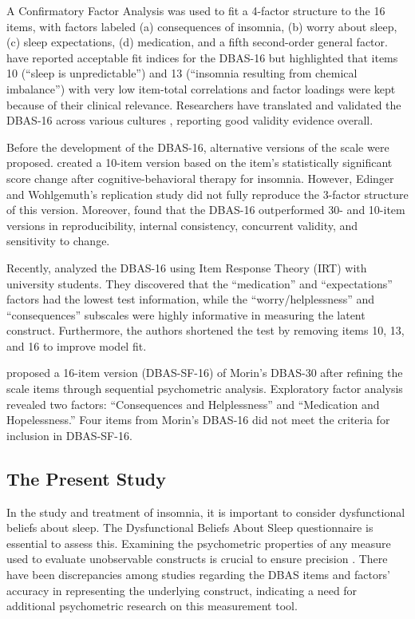 \documentclass[
  12pt,
  twoside,
  openright,
  a4paper,
  chapter=TITLE,
  section=TITLE,
  brazil]{abntex2}
\begin{document}
A Confirmatory Factor Analysis was used to fit a 4-factor structure to
the 16 items, with factors labeled (a) consequences of insomnia, (b)
worry about sleep, (c) sleep expectations, (d) medication, and a fifth
second-order general factor. \textcite{morin2007a} have reported
acceptable fit indices for the DBAS-16 but highlighted that items 10
(``sleep is unpredictable'') and 13 (``insomnia resulting from chemical
imbalance'') with very low item-total correlations and factor loadings
were kept because of their clinical relevance. Researchers have
translated and validated the DBAS-16 across various cultures
\autocites[e.g.,][]{boysan2010,dhyani2013,lang2017}, reporting good
validity evidence overall.

Before the development of the DBAS-16, alternative versions of the scale
were proposed. \textcite{espie2000} created a 10-item version based on
the item's statistically significant score change after
cognitive-behavioral therapy for insomnia. However, Edinger and
Wohlgemuth's \autocite*{edinger2001a} replication study did not fully
reproduce the 3-factor structure of this version. Moreover,
\textcite{chungka-fai2016} found that the DBAS-16 outperformed 30- and
10-item versions in reproducibility, internal consistency, concurrent
validity, and sensitivity to change.

Recently, \textcite{castillo2023} analyzed the DBAS-16 using Item
Response Theory (IRT) with university students. They discovered that the
``medication'' and ``expectations'' factors had the lowest test
information, while the ``worry/helplessness'' and ``consequences''
subscales were highly informative in measuring the latent construct.
Furthermore, the authors shortened the test by removing items 10, 13,
and 16 to improve model fit.

\textcite{clemente2023} proposed a 16-item version (DBAS-SF-16) of
Morin's DBAS-30 after refining the scale items through sequential
psychometric analysis. Exploratory factor analysis revealed two factors:
``Consequences and Helplessness'' and ``Medication and Hopelessness.''
Four items from Morin's DBAS-16 did not meet the criteria for inclusion
in DBAS-SF-16.

\hypertarget{the-present-study}{%
\subsection{The Present Study}\label{the-present-study}}

In the study and treatment of insomnia, it is important to consider
dysfunctional beliefs about sleep. The Dysfunctional Beliefs About Sleep
questionnaire is essential to assess this. Examining the psychometric
properties of any measure used to evaluate unobservable constructs is
crucial to ensure precision \autocite{mcneish2022a}. There have been
discrepancies among studies regarding the DBAS items and factors'
accuracy in representing the underlying construct, indicating a need for
additional psychometric research on this measurement tool.
\end{document}
